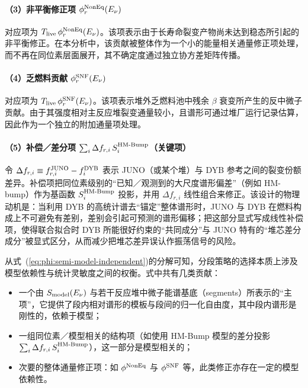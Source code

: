 \paragraph*{（3）非平衡修正项 $\phi^{\rm NonEq}_r(E_\nu)$}
对应项为 $T_{\rm live}\,\phi^{\rm NonEq}_r(E_\nu)$。该项表示由于长寿命裂变产物尚未达到稳态所引起的非平衡修正。在本分析中，该贡献被整体作为一个小的能量相关通量修正项处理，而不再在同位素层面展开，其不确定度通过独立协方差矩阵传播。

\paragraph*{（4）乏燃料贡献 $\phi^{\rm SNF}_r(E_\nu)$}
对应项为 $T_{\rm live}\,\phi^{\rm SNF}_r(E_\nu)$。该项表示堆外乏燃料池中残余 $\beta$ 衰变所产生的反中微子贡献。由于其强度相对主反应堆裂变通量较小，且谱形可通过堆厂运行记录估算，因此作为一个独立的附加通量项处理。

\paragraph*{（5）补偿／差分项 $\sum_i \Delta f_{r,i}\,S_i^{\rm HM\text{-}Bump}$（关键项）}
令 $\Delta f_{r,i}\equiv f_{r,i}^{\rm JUNO}-f_i^{\rm DYB}$ 表示 JUNO（或某个堆）与 DYB 参考之间的裂变份额差异。补偿项把同位素级别的“已知／观测到的大尺度谱形偏差”（例如 HM-bump）作为基函数 $S_i^{\rm HM\text{-}Bump}$ 投影，并用 $\Delta f_{r,i}$ 线性组合来修正。该设计的物理动机是：当利用 DYB 的高统计谱去“锚定”整体谱形时，JUNO 与 DYB 在燃料构成上不可避免有差别，差别会引起可预测的谱形偏移；把这部分显式写成线性补偿项，使得联合拟合时 DYB 所能很好约束的“共同成分”与 JUNO 特有的“堆芯差分成分”被显式区分，从而减少把堆芯差异误认作振荡信号的风险。

从式~(\ref{eq:phi:semi-model-independent})的分解可知，分段策略的选择本质上涉及模型依赖性与统计灵敏度之间的权衡。式中共有几类贡献：

\begin{itemize}
\item 一个由 $S_{\rm model}(E_\nu)$ 与若干反应堆中微子能谱基底（segments）所表示的“主项”，它提供了段内相对谱形的模板与段间的归一化自由度，其中段内谱形是刚性的，依赖于模型；
\item 一组同位素／模型相关的结构项（如使用 HM-Bump 模型的差分投影
  $\sum_i \Delta f_{r,i}\,S_i^{\rm HM\text{-}Bump}$），这一部分是模型相关的；
\item 次要的整体通量修正项：如 $\phi^{\rm NonEq}$ 与 $\phi^{\rm SNF}$ 等，此类修正亦存在一定的模型依赖性。
\end{itemize}
    

